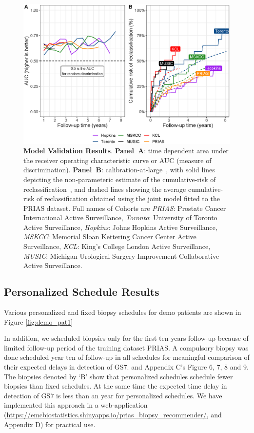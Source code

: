 \begin{figure}
\centerline{\includegraphics[width=\columnwidth]{images/auc_beforecalib.eps}}
\caption{\textbf{Model Validation Results}. \textbf{Panel~A}: time dependent area under the receiver operating characteristic curve or AUC (measure of discrimination). \textbf{Panel~B}: calibration-at-large~\citep{royston2013external,steyerberg2010assessing}, with solid lines depicting the non-parameteric estimate of the cumulative-risk of reclassification~\citep{turnbull1976empirical}, and dashed lines showing the average cumulative-risk of reclassification obtained using the joint model fitted to the PRIAS dataset. Full names of Cohorts are \textit{PRIAS}: Prostate Cancer International Active Surveillance, \textit{Toronto}: University of Toronto Active Surveillance, \textit{Hopkins}: Johns Hopkins Active Surveillance, \textit{MSKCC}: Memorial Sloan Kettering Cancer Center Active Surveillance, \textit{KCL}: King's College London Active Surveillance, \textit{MUSIC}: Michigan Urological Surgery Improvement Collaborative Active Surveillance.}
\label{fig:auc_beforecalib}
\end{figure}

\subsection{Personalized Schedule Results}
Various personalized and fixed biopsy schedules for demo patients are shown in Figure \ref{fig:demo_pat1} 

In addition, we scheduled biopsies only for the first ten years follow-up because of limited follow-up period of the training dataset PRIAS. A compulsory biopsy was done scheduled year ten of follow-up in all schedules for meaningful comparison of their expected delays in detection of GS7. and Appendix C's Figure 6, 7, 8 and 9. The biopsies denoted by `B' show that personalized schedules schedule fewer biopsies than fixed schedules. At the same time the expected time delay in detection of GS7 is less than an year for personalized schedules. We have implemented this approach in a web-application (\url{https://emcbiostatistics.shinyapps.io/prias_biopsy_recommender/}, and Appendix D) for practical use.